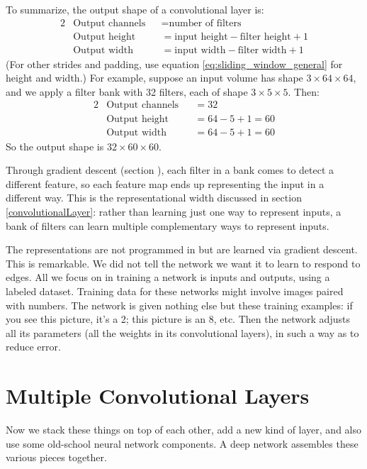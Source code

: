 To summarize, the output shape of a convolutional layer is:
\begin{alignat*}{2}
&\text{Output channels} &&= \text{number of filters}\\
&\text{Output height} &&= \text{input height} - \text{filter height} + 1\\
&\text{Output width} &&= \text{input width} - \text{filter width} + 1
\end{alignat*}
(For other strides and padding, use equation \ref{eq:sliding_window_general} for height and width.) For example, suppose an input volume has shape $3 \times 64 \times 64$, and we apply a filter bank with 32 filters, each of shape $3 \times 5 \times 5$. Then:
\begin{alignat*}{2}
&\text{Output channels} &&= 32\\
&\text{Output height} &&= 64 - 5 + 1 = 60\\
&\text{Output width} &&= 64 - 5 + 1 = 60
\end{alignat*}
So the output shape is $32 \times 60 \times 60$.

Through gradient descent (section ), each filter in a bank comes to detect a different feature, so each feature map ends up representing the input in a different way. This is the representational width discussed in section \ref{convolutionalLayer}: rather than learning just one way to represent inputs, a bank of filters can learn multiple complementary ways to represent inputs.

The representations are not programmed in but are learned via gradient descent. This is remarkable. We did not tell the network we want it to learn to respond to edges. All we focus on in training a network is inputs and outputs, using a labeled dataset. Training data for these networks might involve images paired with numbers. The network is given nothing else but these training examples: if you see this picture, it's a 2; this picture is an 8, etc. Then the network adjusts all its parameters (all the weights in its convolutional layers), in such a way as to reduce error.

\section{Multiple Convolutional Layers}

Now we stack these things on top of each other, add a new kind of layer, and also use some old-school neural network components. A deep network assembles these various pieces together.

